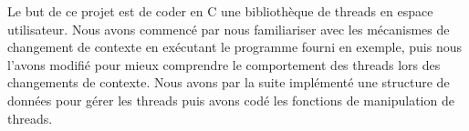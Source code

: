 

Le but de ce projet est de coder en C une bibliothèque de threads en
espace utilisateur. Nous avons commencé par nous familiariser avec les
mécanismes de changement de contexte en exécutant le programme fourni
en exemple, puis nous l'avons modifié pour mieux comprendre le
comportement des threads lors des changements de contexte. Nous avons
par la suite implémenté une structure de données pour gérer les
threads puis avons codé les fonctions de manipulation de threads.


